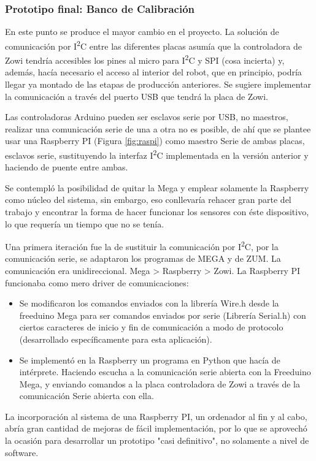 \subsubsection{Prototipo final: Banco de Calibración}

En este punto se produce el mayor cambio en el proyecto. La solución de comunicación por I\textsuperscript{2}C entre las diferentes placas asumía que la controladora de Zowi tendría accesibles los pines al micro para I\textsuperscript{2}C y SPI (cosa incierta) y, además, hacía necesario el acceso al interior del robot, que en principio, podría llegar ya montado de las etapas de producción anteriores. Se sugiere implementar la comunicación a través del puerto USB que tendrá la placa de Zowi.

Las controladoras Arduino pueden ser esclavos serie por USB, no maestros, realizar una comunicación serie de una a otra no es posible, de ahí que se plantee usar una Raspberry PI (Figura \ref{fig:raspi}) como maestro Serie de ambas placas, esclavos serie, sustituyendo la interfaz I\textsuperscript{2}C implementada en la versión anterior y haciendo de puente entre ambas.

Se contempló la posibilidad de quitar la Mega y emplear solamente la Raspberry como núcleo del sistema, sin embargo, eso conllevaría rehacer gran parte del trabajo y encontrar la forma de hacer funcionar los sensores con éste dispositivo, lo que requería un tiempo que no se tenía.

Una primera iteración fue la de sustituir la comunicación por I\textsuperscript{2}C, por la comunicación serie, se adaptaron los programas de MEGA y de ZUM. La comunicación era unidireccional. Mega > Raspberry > Zowi. La Raspberry PI funcionaba como mero driver de comunicaciones:
\begin{itemize}
  \item Se modificaron los comandos enviados con la librería Wire.h desde la freeduino Mega para ser comandos enviados por serie (Librería Serial.h) con ciertos caracteres de inicio y fin de comunicación a modo de protocolo (desarrollado específicamente para esta aplicación).
  \item Se implementó en la Raspberry un programa en Python que hacía de intérprete. Haciendo escucha a la comunicación serie abierta con la Freeduino Mega, y enviando comandos a la placa controladora de Zowi a través de la comunicación Serie abierta con ella.
\end{itemize}

La incorporación al sistema de una Raspberry PI, un ordenador al fin y al cabo, abría gran cantidad de mejoras de fácil implementación, por lo que se aprovechó la ocasión para desarrollar un prototipo "casi definitivo", no solamente a nivel de software.


